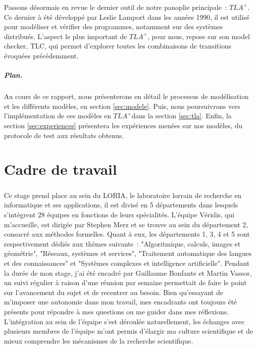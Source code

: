 \documentclass[oneside, a4paper, 11pt]{book}
\newcommand{\TLA}{\ensuremath{TLA^+}}
\begin{document}
\noindent
Passons désormais en revue le dernier outil de notre panoplie principale~: \TLA. 
Ce dernier à été développé par Leslie Lamport dans les années 1990, il est utilisé pour modéliser et vérifier des programmes, notamment sur des systèmes distribués. 
L'aspect le plus important de \TLA, pour nous, repose sur son model checker, TLC, qui permet d'explorer toutes les combinaisons de transitions évoquées précédemment.
\\
\paragraph{Plan.} Au cours de ce rapport, nous présenterons en détail le processus de modélisation et les différents modèles, en section \ref{sec:modele}. Puis, nous poursuivrons vers l'implémentation de ces modèles en \TLA dans la section \ref{sec:tla}.
Enfin, la section \ref{sec:experiences} présentera les expériences menées sur nos modèles, du protocole de test aux résultats obtenus.










\chapter{Cadre de travail}
\paragraph{} 
Ce stage prend place au sein du LORIA, le laboratoire lorrain de recherche en informatique et ses applications, il est divisé en 5 départements dans lesquels s'intègrent 28 équipes en fonctions de leurs spécialités.
L'équipe Véridis, qui m'accueille, est dirigée par Stephen Merz et se trouve au sein du département 2, consacré aux méthodes formelles. Quant à eux, les départements 1, 3, 4 et 5 sont respectivement dédiés aux thèmes suivants~: "Algoritmique, calculs, images et géométrie", "Réseaux, systèmes et services", "Traitement automatique des langues et des connaissances" et "Systèmes complexes et intelligence artificielle".
Pendant la durée de mon stage, j'ai été encadré par Guillaume Bonfante et Martin Vassor, un suivi régulier à raison d'une réunion par semaine permettait de faire le point sur l'avancement du sujet et de recentrer au besoin.
Bien qu'essayant de m'imposer une autonomie dans mon travail, mes encadrants ont toujours été présents pour répondre à mes questions ou me guider dans mes réflexions.
L'intégration au sein de l'équipe s'est déroulée naturellement, les échanges avec plusieurs membres de l'équipe m'ont permis d'élargir ma culture scientifique et de mieux comprendre les mécanismes de la recherche scientifique.
\end{document}
